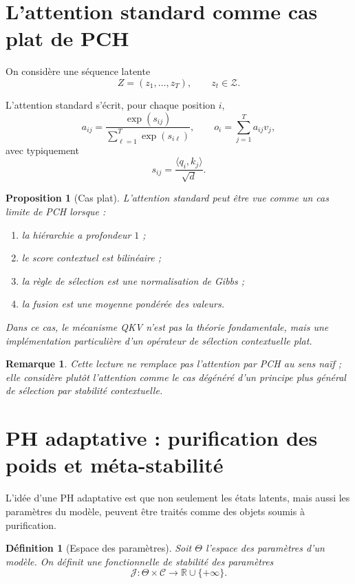 \documentclass[11pt,a4paper]{article}
\newtheorem{definition}{Définition}[section]
\newtheorem{proposition}{Proposition}[section]
\newtheorem{remark}{Remarque}[section]
\newcommand{\C}{\mathcal C}
\newcommand{\Z}{\mathcal Z}
\newcommand{\R}{\mathbb R}
\newcommand{\1}{\mathbf 1}
\begin{document}
\section{L'attention standard comme cas plat de PCH}

On considère une séquence latente
\[
Z=(z_1,\dots,z_T),\qquad z_t\in\Z.
\]

L'attention standard s'écrit, pour chaque position \(i\),
\[
a_{ij}
=
\frac{\exp\!\left(s_{ij}\right)}{\sum_{\ell=1}^T \exp\!\left(s_{i\ell}\right)},
\qquad
o_i = \sum_{j=1}^T a_{ij} v_j,
\]
avec typiquement
\[
s_{ij} = \frac{\langle q_i,k_j\rangle}{\sqrt{d}}.
\]

\begin{proposition}[Cas plat]
L'attention standard peut être vue comme un cas limite de PCH lorsque :
\begin{enumerate}[leftmargin=2em]
    \item la hiérarchie a profondeur \(1\) ;
    \item le score contextuel est bilinéaire ;
    \item la règle de sélection est une normalisation de Gibbs ;
    \item la fusion est une moyenne pondérée des valeurs.
\end{enumerate}
Dans ce cas, le mécanisme QKV n'est pas la théorie fondamentale, mais une implémentation particulière d'un opérateur de sélection contextuelle plat.
\end{proposition}

\begin{remark}
Cette lecture ne remplace pas l'attention par PCH au sens naïf ; elle considère plutôt l'attention comme le \emph{cas dégénéré} d'un principe plus général de sélection par stabilité contextuelle.
\end{remark}

\section{PH adaptative : purification des poids et méta-stabilité}

L'idée d'une PH adaptative est que non seulement les états latents, mais aussi les paramètres du modèle, peuvent être traités comme des objets soumis à purification.

\begin{definition}[Espace des paramètres]
Soit \(\Theta\) l'espace des paramètres d'un modèle. On définit une fonctionnelle de stabilité des paramètres
\[
\mathcal J : \Theta \times \C \to \R\cup\{+\infty\}.
\]
\end{definition}
\end{document}

